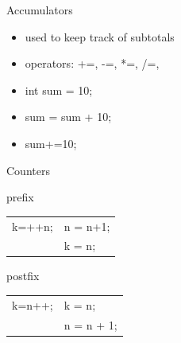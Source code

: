 \documentclass[xcolor={dvipsnames}]{beamer}
\begin{document}
\begin{frame}{Accumulators}
	\begin{block}{}
		\begin{itemize}
		\item used to keep track of subtotals
		\item operators: +=, -=, *=, /=, %
		\end{itemize}
	\end{block}
	
	\begin{block}{}
		\begin{itemize}
			\item int sum = 10;
			\item sum = sum + 10;
			\item sum+=10;
		\end{itemize}
	\end{block}
\end{frame}

\begin{frame}{Counters}
\begin{block}{prefix}
	\begin{tabular}{l l}
		k=++n; & n = n+1; \\
			   & k = n;\\
	\end{tabular}
\end{block}
\begin{block}{postfix}
	\begin{tabular}{l l}
		k=n++; & k = n; \\
			   & n = n + 1;\\
	\end{tabular}
\end{block}
\end{frame}
\end{document}

